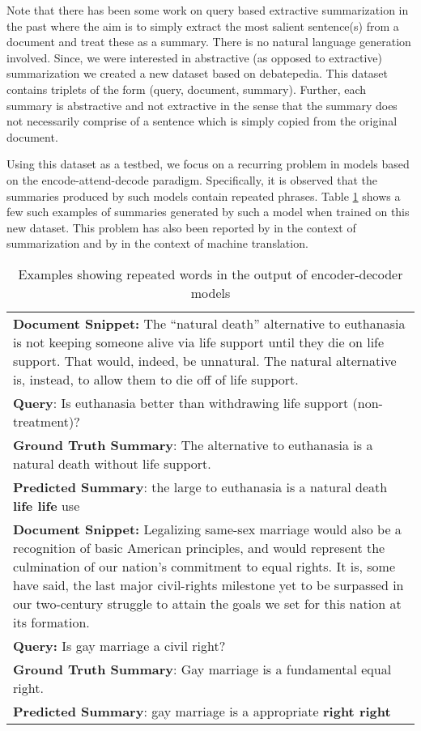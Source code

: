 \documentclass[11pt]{article}
\begin{document}
Note that there has been some work on query based extractive summarization in the past where the aim is to simply extract the most salient sentence(s) from a document and treat these as a summary. There is no natural language generation involved. Since, we were interested in abstractive (as opposed to extractive) summarization we created a new dataset based on debatepedia. This dataset contains triplets of the form (query, document, summary). Further, each summary is abstractive and not extractive in the sense that the summary does not necessarily comprise of a sentence which is simply copied from the original document. 

Using  this dataset as a testbed, we focus on a recurring problem in models based on the encode-attend-decode paradigm. Specifically, it is observed that the summaries produced by such models contain repeated phrases. Table \ref{rp} shows a few such examples of summaries generated by such a model when trained on this new dataset. This problem has also been reported by \cite{chen2016distraction} in the context of summarization and by \cite{sankaran2016temporal} in the context of machine translation.

\begin{table}
\begin{tabular}{|p{}|}
\hline 
\hline
\textbf{Document Snippet:}
 The ``natural death'' alternative to euthanasia is not keeping someone alive via life support until they die on life support. That would, indeed, be unnatural. The natural alternative is, instead, to allow them to die off of life support.  \\
\textbf{Query}: Is euthanasia better than withdrawing life support (non-treatment)? \\
\textbf{Ground Truth Summary}:
 The alternative to euthanasia is a natural death without life support.   \\

\textbf{Predicted Summary}:
the large to euthanasia is a natural death \textbf{life life} use \\
\hline
\textbf{Document Snippet:}
Legalizing same-sex marriage would also be a recognition of basic American principles, and would represent the culmination of our nation's commitment to equal rights. It is, some have said, the last major civil-rights milestone yet to be surpassed in our two-century struggle to attain the goals we set for this nation at its formation.  \\
\textbf{Query:} Is gay marriage a civil right?\\
\textbf{Ground Truth Summary}:
 Gay marriage is a fundamental equal right. \\
\textbf{Predicted Summary}:
gay marriage is a appropriate \textbf{right right} \\
\hline

\end{tabular}
\\
\caption{Examples showing repeated words in the output of encoder-decoder models}
\label{rp}
\end{table}
\end{document}
